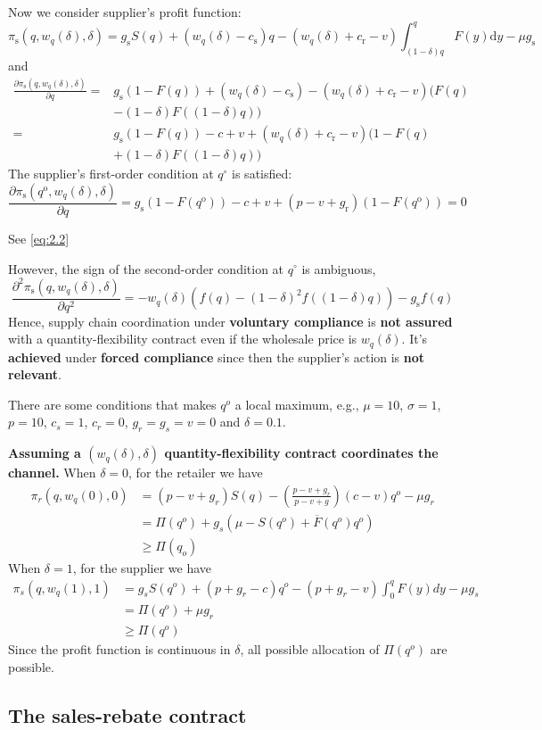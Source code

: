 Now we consider supplier's profit function:
$$
\pi_{\mathrm{s}}\left(q, w_{q}(\delta), \delta\right)=g_{\mathrm{s}} S(q)+\left(w_{q}(\delta)-c_{\mathrm{s}}\right) q-\left(w_{q}(\delta)+c_{\mathrm{r}}-v\right) \int_{(1-\delta) q}^{q} F(y) \mathrm{d} y-\mu g_{\mathrm{s}}
$$
and
$$
\begin{aligned}
\frac{\partial \pi_{\mathrm{s}}\left(q, w_{q}(\delta), \delta\right)}{\partial q}=& g_{\mathrm{s}}(1-F(q))+\left(w_{q}(\delta)-c_{\mathrm{s}}\right)-\left(w_{q}(\delta)+c_{\mathrm{r}}-v\right)(F(q)\\
&-(1-\delta) F((1-\delta) q)) \\
=& g_{\mathrm{s}}(1-F(q))-c+v+\left(w_{q}(\delta)+c_{\mathrm{r}}-v\right)(1-F(q)\\
&+(1-\delta) F((1-\delta) q))
\end{aligned}
$$
The supplier's first-order condition at $q^{\circ}$ is satisfied:
$$
\frac{\partial \pi_{\mathrm{s}}\left(q^{\mathrm{o}}, w_{q}(\delta), \delta\right)}{\partial q}=g_{\mathrm{s}}\left(1-F\left(q^{\mathrm{o}}\right)\right)-c+v+\left(p-v+g_{\mathrm{r}}\right)\left(1-F\left(q^{\mathrm{o}}\right)\right)=0
$$
\begin{note}
    See \autoref{eq:2.2}
\end{note}
However, the sign of the second-order condition at $q^{\circ}$ is ambiguous,
$$
\frac{\partial^{2} \pi_{\mathrm{s}}\left(q, w_{q}(\delta), \delta\right)}{\partial q^{2}}=-w_{q}(\delta)\left(f(q)-(1-\delta)^{2} f((1-\delta) q)\right)-g_{\mathrm{s}} f(q)
$$
Hence, supply chain coordination under \textbf{voluntary compliance} is \textbf{not assured} with a quantity-flexibility contract even if the wholesale price is $w_q(\delta)$. It's \textbf{achieved} under \textbf{forced compliance} since then the supplier's action is \textbf{not relevant}.
\begin{note}
    There are some conditions that makes $q^o$ a local maximum, e.g., $\mu=10$, $\sigma=1$, $p=10$, $c_s=1$, $c_r=0$, $g_r=g_s=v=0$ and $\delta=0.1$. 
\end{note}

\textbf{Assuming a $(w_q(\delta),\delta)$ quantity-flexibility contract coordinates the channel.} When $\delta=0$, for the retailer we have
\begin{align*}
    \pi_r(q,w_q(0),0)&=(p-v+g_r)S(q)-\left(\frac{p-v+g_r}{p-v+g}\right)(c-v)q^o-\mu g_r\\
    &=\Pi(q^o)+g_s\left(\mu-S(q^o)+\overline{F}(q^o) q^o \right)\\
    &\geq \Pi(q_o)
\end{align*}
When $\delta=1$, for the supplier we have
\begin{align*}
    \pi_s(q,w_q(1),1)&=g_s S(q^o)+(p+g_r-c)q^o-(p+g_r-v)\int_0^q F(y)dy-\mu g_s\\
    &=\Pi(q^o)+\mu g_r\\
    &\geq \Pi(q^o)
\end{align*}
Since the profit function is continuous in $\delta$, all possible allocation of $\Pi(q^o)$ are possible.

\subsection{The sales-rebate contract}

